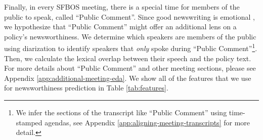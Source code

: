 \documentclass[11pt]{article}
\begin{document}
Finally, in every SFBOS meeting, there is a special time for members of the public to speak, called ``Public Comment''. Since good newswriting is emotional \cite{uribe2007aresensational}, we hypothesize that ``Public Comment'' might offer an additional lens on a policy's newsworthiness. We determine which speakers are members of the public using diarization to identify speakers that \textit{only} spoke during ``Public Comment''\footnote{We infer the sections of the transcript like ``Public Comment'' using time-stamped agendas, see Appendix \ref{app:aligning-meeting-transcripts} for more detail.}. Then, we calculate the lexical overlap between their speech and the policy text. For more details about ``Public Comment'' and other meeting sections, please see Appendix \ref{app:additional-meeting-eda}. We show all of the features that we use for newsworthiness prediction in Table \ref{tab:features}.





\end{document}
